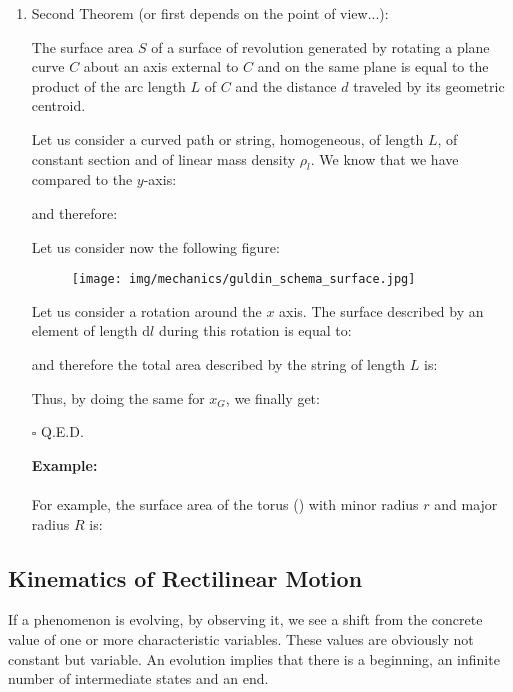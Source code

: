\begin{enumerate}
\begin{tcolorbox}[colframe=black,colback=white,sharp corners]
		\end{tcolorbox}
		
		\item Second Theorem (or first depends on the point of view...):
		\begin{theorem}
		The surface area $S$ of a surface of revolution generated by rotating a plane curve $C$ about an axis external to $C$ and on the same plane is equal to the product of the arc length $L$ of $C$ and the distance $d$ traveled by its geometric centroid.
		\end{theorem}
		\begin{dem}
		Let us consider a curved path or string, homogeneous, of length $L$, of constant section and of linear mass density $\rho_l$. We know that we have compared to the $y$-axis:
		
		and therefore:
		
		
		Let us consider now the following figure:
		\begin{figure}[H]
			\centering
			\texttt{[image: img/mechanics/guldin\_schema\_surface.jpg]}
		\end{figure}
		Let us consider a rotation around the $x$ axis. The surface described by an element of length $\mathrm{d}l$ during this rotation is equal to:
		
		and therefore the total area described by the string of length $L$ is:
		
		Thus, by doing the same for $x_G$, we finally get:
		
		\begin{flushright}
			$\square$  Q.E.D.
		\end{flushright}
		\end{dem}
		
	
		\begin{tcolorbox}[colframe=black,colback=white,sharp corners]
		\textbf{{\Large {}}Example:}\\\\
		For example, the surface area of the torus () with minor radius $r$ and major radius $R$ is:
		
		\end{tcolorbox}
	\end{enumerate}
	
	\pagebreak
	\subsection{Kinematics of Rectilinear Motion}
		If a phenomenon is evolving, by observing it, we see a shift from the concrete value of one or more characteristic variables. These values are obviously not constant but variable. An evolution implies that there is a beginning, an infinite number of intermediate states and an end. 

